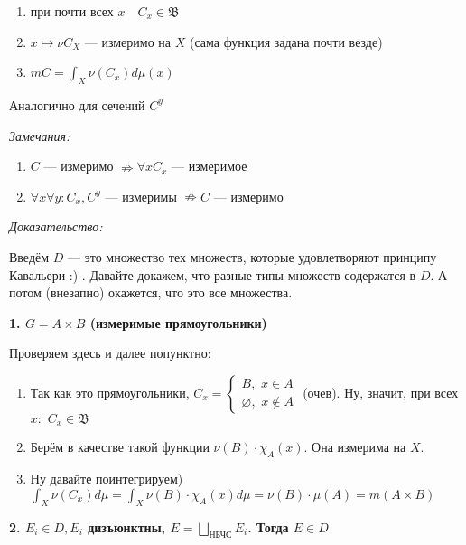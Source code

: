 \documentclass{article}
\def\dbl{\,\,}
\begin{document}
\begin{enumerate}
    \item при почти всех $x \quad C_{x} \in \mathfrak{B}$ 
    \item $x \mapsto \nu C_{X}$ --- измеримо на $X$ (сама функция задана почти везде)
    \item $m C = \int_{X} \nu (C_{x}) d\mu(x)$
\end{enumerate}

Аналогично для сечений $C^{y}$

\textit{Замечания:}
\begin{enumerate}
    \item $C$ --- измеримо $\nRightarrow \forall x C_x$ --- измеримое 
    \item $\forall x \forall y: C_x, C^y$ --- измеримы $\nRightarrow C$ --- измеримо
\end{enumerate}

\textit{Доказательство:}

Введём $D$ --- это множество тех множеств, которые удовлетворяют принципу Кавальери :) . Давайте докажем, что разные типы множеств содержатся в $D$. А потом (внезапно) окажется, что это все множества.

\textbf{1. $G = A \times B$ (измеримые прямоугольники)}

Проверяем здесь и далее попунктно:

\begin{enumerate}
    \item Так как это прямоугольники, $C_x = \begin{cases}
        B, \dbl x \in A\\
        \varnothing, \dbl x \notin A
        \end{cases}$ (очев). Ну, значит, при всех $x: \dbl C_x \in \mathfrak{B}$
    \item Берём в качестве такой функции $\nu(B) \cdot \chi_A(x)$. Она измерима на $X$.
    \item Ну давайте поинтегрируем) $\int_{X} \nu(C_x) d\mu = \int_{X} \nu(B) \cdot \chi_A(x) d\mu = \nu(B) \cdot \mu(A) = m(A \times B)$
\end{enumerate}

\textbf{2. $E_i \in D, E_i$ дизъюнктны, $E = \bigsqcup_{\text{НБЧС}} E_i$. Тогда $E \in D$}
\end{document}
